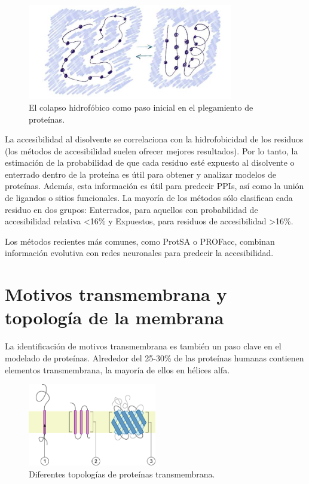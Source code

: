 \begin{figure}[h]
\centering
\includegraphics[width = 0.8\textwidth]{figs/collapse.png}
\caption{El colapso hidrofóbico como paso inicial en el plegamiento de proteínas.}
\end{figure}

La accesibilidad al disolvente se correlaciona con la hidrofobicidad de los residuos (los métodos de accesibilidad suelen ofrecer mejores resultados). Por lo tanto, la estimación de la probabilidad de que cada residuo esté expuesto al disolvente o enterrado dentro de la proteína es útil para obtener y analizar modelos de proteínas. Además, esta información es útil para predecir PPIs, así como la unión de ligandos o sitios funcionales. La mayoría de los métodos sólo clasifican cada residuo en dos grupos: Enterrados, para aquellos con probabilidad de accesibilidad relativa <16\% y Expuestos, para residuos de accesibilidad >16\%.

Los métodos recientes más comunes, como ProtSA o PROFacc, combinan información evolutiva con redes neuronales para predecir la accesibilidad.

\section{Motivos transmembrana y topología de la membrana}
La identificación de motivos transmembrana es también un paso clave en el modelado de proteínas. Alrededor del 25-30\% de las proteínas humanas contienen elementos transmembrana, la mayoría de ellos en hélices alfa.

\begin{figure}[h]
\centering
\includegraphics[width = 0.5\textwidth]{figs/mb.png}
\caption{Diferentes topologías de proteínas transmembrana.}
\end{figure}


